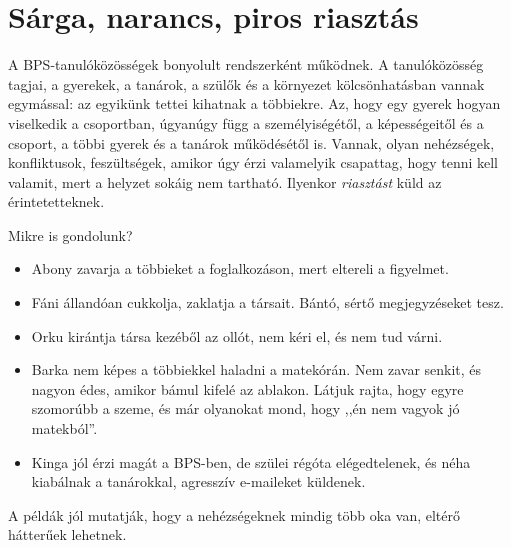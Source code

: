 \hypertarget{sarga-narancs-piros-riasztas}{%
\section{Sárga, narancs, piros
riasztás}\label{sarga-narancs-piros-riasztas}}

A BPS-tanulóközösségek bonyolult rendszerként működnek. A tanulóközösség
tagjai, a gyerekek, a tanárok, a szülők és a környezet kölcsönhatásban vannak
egymással: az egyikünk tettei kihatnak a többiekre. Az, hogy egy gyerek
hogyan viselkedik a csoportban, úgyanúgy függ a személyiségétől,
a képességeitől és a csoport, a többi gyerek és a tanárok működésétől is.
Vannak, olyan nehézségek, konfliktusok, feszültségek, amikor úgy érzi
valamelyik csapattag, hogy tenni kell valamit, mert a helyzet sokáig nem
tartható. Ilyenkor \emph{riasztást} küld az érintetetteknek.

Mikre is gondolunk?

\begin{itemize}
\tightlist
\item
  Abony zavarja a többieket a foglalkozáson, mert eltereli a figyelmet.
\item
  Fáni állandóan cukkolja, zaklatja a társait. Bántó, sértő
  megjegyzéseket tesz.
\item
  Orku kirántja társa kezéből az ollót, nem kéri el, és nem tud várni.
\item
  Barka nem képes a többiekkel haladni a matekórán. Nem zavar senkit, és
  nagyon édes, amikor bámul kifelé az ablakon. Látjuk rajta, hogy egyre
  szomorúbb a szeme, és már olyanokat mond, hogy ,,én nem vagyok jó
  matekból''.
\item
  Kinga jól érzi magát a BPS-ben, de szülei régóta elégedtelenek, és néha
  kiabálnak a tanárokkal, agresszív e-maileket küldenek.
\end{itemize}

A példák jól mutatják, hogy a nehézségeknek mindig több oka van, eltérő
hátterűek lehetnek.

